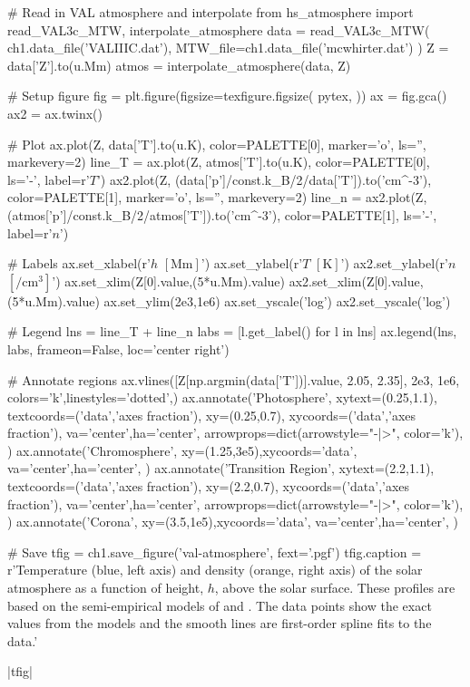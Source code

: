 \begin{pycode}[chapter1]
# Read in VAL atmosphere and interpolate
from hs_atmosphere import read_VAL3c_MTW, interpolate_atmosphere
data = read_VAL3c_MTW(
    ch1.data_file('VALIIIC.dat'),
    MTW_file=ch1.data_file('mcwhirter.dat')
)
Z = data['Z'].to(u.Mm)
atmos = interpolate_atmosphere(data, Z)

# Setup figure
fig = plt.figure(figsize=texfigure.figsize(
    pytex,
))
ax = fig.gca()
ax2 = ax.twinx()

# Plot
ax.plot(Z, data['T'].to(u.K), color=PALETTE[0], marker='o', ls='', markevery=2)
line_T = ax.plot(Z, atmos['T'].to(u.K), color=PALETTE[0], ls='-', label=r'$T$')
ax2.plot(Z, (data['p']/const.k_B/2/data['T']).to('cm^-3'),
            color=PALETTE[1], marker='o', ls='', markevery=2)
line_n = ax2.plot(Z, (atmos['p']/const.k_B/2/atmos['T']).to('cm^-3'),
                    color=PALETTE[1], ls='-', label=r'$n$')

# Labels
ax.set_xlabel(r'$h$ $[\si{\mega\m}]$')
ax.set_ylabel(r'$T$ $[\si{\kelvin}]$')
ax2.set_ylabel(r'$n$ $[\si{\per\cubic\cm}]$')
ax.set_xlim(Z[0].value,(5*u.Mm).value)
ax2.set_xlim(Z[0].value,(5*u.Mm).value)
ax.set_ylim(2e3,1e6)
ax.set_yscale('log')
ax2.set_yscale('log')

# Legend
lns = line_T + line_n
labs = [l.get_label() for l in lns]
ax.legend(lns, labs, frameon=False, loc='center right')

# Annotate regions
ax.vlines([Z[np.argmin(data['T'])].value, 2.05, 2.35], 2e3, 1e6,
            colors='k',linestyles='dotted',)
ax.annotate('Photosphere',
            xytext=(0.25,1.1), textcoords=('data','axes fraction'),
            xy=(0.25,0.7), xycoords=('data','axes fraction'),
            va='center',ha='center',
            arrowprops=dict(arrowstyle="-|>", color='k'),
)
ax.annotate('Chromosphere',
            xy=(1.25,3e5),xycoords='data',
            va='center',ha='center',
)
ax.annotate('Transition Region',
            xytext=(2.2,1.1), textcoords=('data','axes fraction'),
            xy=(2.2,0.7), xycoords=('data','axes fraction'),
            va='center',ha='center',
            arrowprops=dict(arrowstyle="-|>", color='k'),
)
ax.annotate('Corona',
            xy=(3.5,1e5),xycoords='data',
            va='center',ha='center',
)

# Save
tfig = ch1.save_figure('val-atmosphere', fext='.pgf')
tfig.caption = r'Temperature (blue, left axis) and density (orange, right axis) of the solar atmosphere as a function of height, $h$, above the solar surface. These profiles are based on the semi-empirical models of \citet{mcwhirter_heating_1975} and \citet{vernazza_structure_1981}. The data points show the exact values from the models and the smooth lines are first-order spline fits to the data.'
\end{pycode}
\py[chapter1]|tfig|

